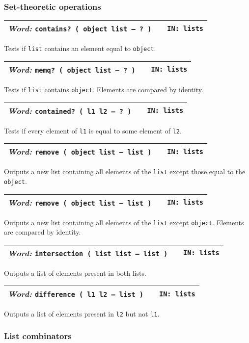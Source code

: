 \documentclass{report}
\newcommand{\ordinaryword}[3]{\index{#1}
\emph{Word:} \texttt{#2} &&\texttt{IN: #3}}
\newcommand{\wordtable}[1]{

\begin{tabularx}{12cm}[t]{lXr}
\hline
#1\\
\hline
\end{tabularx}

}
\begin{document}
\subsubsection{Set-theoretic operations}

\wordtable{
\ordinaryword{contains?}{contains?~( object list -- ?~)}{lists}
}
Tests if \texttt{list} contains an element equal to \texttt{object}.
\wordtable{
\ordinaryword{memq?}{memq?~( object list -- ?~)}{lists}
}
Tests if \texttt{list} contains \texttt{object}. Elements are compared by identity.
\wordtable{
\ordinaryword{contained?}{contained?~( l1 l2 -- ?~)}{lists}
}
Tests if every element of \texttt{l1} is equal to some element of \texttt{l2}.
\wordtable{
\ordinaryword{remove}{remove ( object list -- list )}{lists}
}
Outputs a new list containing all elements of the \texttt{list} except those equal to the \texttt{object}.
\wordtable{
\ordinaryword{remq}{remove ( object list -- list )}{lists}
}
Outputs a new list containing all elements of the \texttt{list} except \texttt{object}. Elements are compared by identity.
\wordtable{
\ordinaryword{intersection}{intersection ( list list -- list )}{lists}
}
Outputs a list of elements present in both lists.
\wordtable{
\ordinaryword{intersection}{difference ( l1 l2 -- list )}{lists}
}
Outputs a list of elements present in \texttt{l2} but not \texttt{l1}.

\subsubsection{List combinators}
\end{document}
